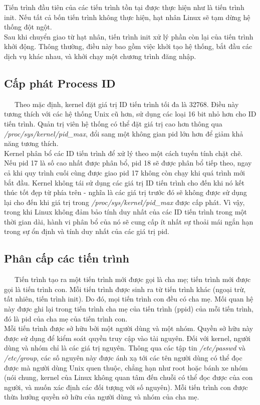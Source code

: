 \documentclass[a4paper,10pt]{report}
\begin{document}
Tiến trình đầu tiên của các tiến trình tồn tại được thực hiện như là tiến trình init. Nếu tất cả bốn tiến trình không thực hiện, hạt nhân Linux sẽ tạm dừng hệ thống đột ngột.\\

Sau khi chuyển giao từ hạt nhân, tiến trình init xử lý phần còn lại của tiến trình khởi động. Thông thường, điều này bao gồm việc khởi tạo hệ thống, bắt đầu các dịch vụ khác nhau, và khởi chạy một chương trình đăng nhập.
\subsection{Cấp phát Process ID}
\ \ \ Theo mặc định, kernel đặt giá trị ID tiến trình tối đa là 32768. Điều này tương thích với các hệ thống Unix cũ hơn, sử dụng các loại 16 bit nhỏ hơn cho ID tiến trình. Quản trị viên hệ thống có thể đặt giá trị cao hơn thông qua \textit{/proc/sys/kernel/pid\_max}, đổi sang một không gian pid lớn hơn để giảm khả năng tương thích. \\ 

Kernel phân bổ các ID tiến trình để xử lý theo một cách tuyến tính chặt chẽ. Nếu pid 17 là số cao nhất được phân bổ, pid 18 sẽ được phân bổ tiếp theo, ngay cả khi quy trình cuối cùng được giao pid 17 không còn chạy khi quá trình mới bắt đầu. Kernel không tái sử dụng các giá trị ID tiến trình cho đến khi nó kết thúc tốt đẹp từ phía trên - nghĩa là các giá trị trước đó sẽ không được sử dụng lại cho đến khi giá trị trong \textit{/proc/sys/kernel/pid\_max} được cấp phát. Vì vậy, trong khi Linux không đảm bảo tính duy nhất của các ID tiến trình trong một thời gian dài, hành vi phân bổ của nó sẽ cung cấp ít nhất sự thoải mái ngắn hạn trong sự ổn định và tính duy nhất của các giá trị pid.
\subsection{Phân cấp các tiến trình}
\ \ \ Tiến trình tạo ra một tiến trình mới được gọi là cha mẹ; tiến trình mới được gọi là tiến trình con. Mỗi tiến trình được sinh ra từ tiến trình khác (ngoại trừ, tất nhiên, tiến trình init). Do đó, mọi tiến trình con đều có cha mẹ. Mối quan hệ này được ghi lại trong tiến trình cha mẹ của tiến trình (ppid) của mỗi tiến trình, đó là pid của cha mẹ của tiến trình con.\\

Mỗi tiến trình được sở hữu bởi một người dùng và một nhóm. Quyền sở hữu này được sử dụng để kiểm soát quyền truy cập vào tài nguyên. Đối với kernel, người dùng và nhóm chỉ là các giá trị nguyên. Thông qua các tập tin \textit{/etc/passwd} và \textit{/etc/group}, các số nguyên này được ánh xạ tới các tên người dùng có thể đọc được mà người dùng Unix quen thuộc, chẳng hạn như root  hoặc bánh xe nhóm (nói chung, kernel của Linux không quan tâm đến chuỗi có thể đọc được của con người, và muốn xác định các đối tượng với số nguyên). Mỗi tiến trình con được thừa hưởng quyền sở hữu của người dùng và nhóm của cha mẹ. \\
\end{document}
